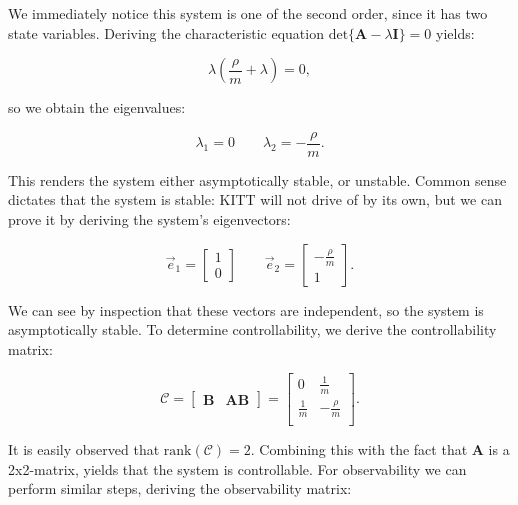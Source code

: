 \documentclass[11pt,titlepage]{report}
\begin{document}
We immediately notice this system is one of the second order, since it has two state variables. Deriving the characteristic equation $\mathrm{det}\{\mathbf{A} - \lambda\mathbf{I}\} = 0$ yields:

\begin{equation}
    \lambda(\frac{\rho}{m} + \lambda) = 0,
\end{equation}

so we obtain the eigenvalues:

\begin{equation}
    \lambda_1 = 0 \quad\quad \lambda_2 = -\frac{\rho}{m}.
\end{equation}

This renders the system either asymptotically stable, or unstable. Common sense dictates that the system is stable: KITT will not drive of by its own, but we can prove it by deriving the system's eigenvectors:

\begin{equation}
    \vec{e}_1 =
        \begin{bmatrix}
            1 \\
            0
        \end{bmatrix}
    \quad\quad
    \vec{e}_2 =
        \begin{bmatrix}
            -\frac{\rho}{m} \\
            1
        \end{bmatrix}.
\end{equation}

We can see by inspection that these vectors are independent, so the system is asymptotically stable. To determine controllability, we derive the controllability matrix:

\begin{equation}
    \mathcal{C} = 
    \begin{bmatrix}
        \mathbf{B} & \mathbf{AB}
    \end{bmatrix} =
    \begin{bmatrix}
        0 & \frac{1}{m} \\
        \frac{1}{m} & -\frac{\rho}{m} \\
    \end{bmatrix}.
\end{equation}

It is easily observed that $\mathrm{rank}(\mathcal{C}) = 2$. Combining this with the fact that $\mathbf{A}$ is a 2x2-matrix, yields that the system is controllable. For observability we can perform similar steps, deriving the observability matrix:
\end{document}
